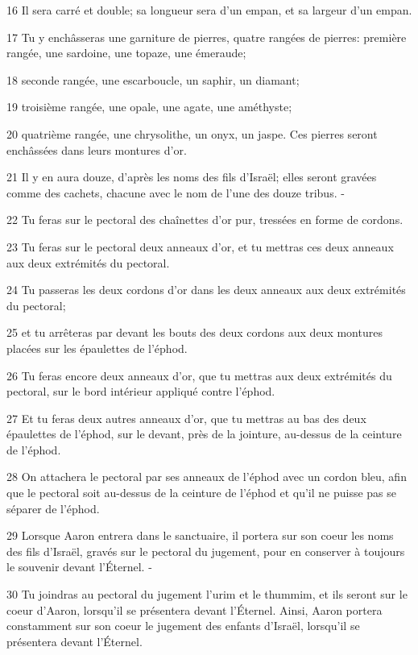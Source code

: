 \par 16 Il sera carré et double; sa longueur sera d'un empan, et sa largeur d'un empan.
\par 17 Tu y enchâsseras une garniture de pierres, quatre rangées de pierres: première rangée, une sardoine, une topaze, une émeraude;
\par 18 seconde rangée, une escarboucle, un saphir, un diamant;
\par 19 troisième rangée, une opale, une agate, une améthyste;
\par 20 quatrième rangée, une chrysolithe, un onyx, un jaspe. Ces pierres seront enchâssées dans leurs montures d'or.
\par 21 Il y en aura douze, d'après les noms des fils d'Israël; elles seront gravées comme des cachets, chacune avec le nom de l'une des douze tribus. -
\par 22 Tu feras sur le pectoral des chaînettes d'or pur, tressées en forme de cordons.
\par 23 Tu feras sur le pectoral deux anneaux d'or, et tu mettras ces deux anneaux aux deux extrémités du pectoral.
\par 24 Tu passeras les deux cordons d'or dans les deux anneaux aux deux extrémités du pectoral;
\par 25 et tu arrêteras par devant les bouts des deux cordons aux deux montures placées sur les épaulettes de l'éphod.
\par 26 Tu feras encore deux anneaux d'or, que tu mettras aux deux extrémités du pectoral, sur le bord intérieur appliqué contre l'éphod.
\par 27 Et tu feras deux autres anneaux d'or, que tu mettras au bas des deux épaulettes de l'éphod, sur le devant, près de la jointure, au-dessus de la ceinture de l'éphod.
\par 28 On attachera le pectoral par ses anneaux de l'éphod avec un cordon bleu, afin que le pectoral soit au-dessus de la ceinture de l'éphod et qu'il ne puisse pas se séparer de l'éphod.
\par 29 Lorsque Aaron entrera dans le sanctuaire, il portera sur son coeur les noms des fils d'Israël, gravés sur le pectoral du jugement, pour en conserver à toujours le souvenir devant l'Éternel. -
\par 30 Tu joindras au pectoral du jugement l'urim et le thummim, et ils seront sur le coeur d'Aaron, lorsqu'il se présentera devant l'Éternel. Ainsi, Aaron portera constamment sur son coeur le jugement des enfants d'Israël, lorsqu'il se présentera devant l'Éternel.
